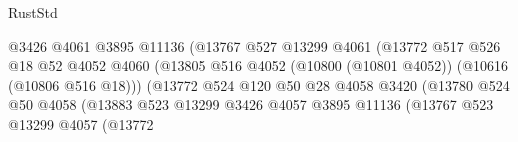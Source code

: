 \begin{lexlean}{RustStd}
\begin{coremodule}
                                                @3426
                                                @4061
                                                @3895
                                                @11136
                                                (@13767
                                                  @527
                                                  @13299
                                                  @4061
                                                  (@13772
                                                    @517
                                                    @526
                                                    @18
                                                    @52
                                                    @4052
                                                    @4060
                                                    (@13805
                                                      @516
                                                      @4052
                                                      (@10800 (@10801 @4052))
                                                      (@10616 (@10806 @516 @18)))
                                                    (@13772
                                                      @524
                                                      @120
                                                      @50
                                                      @28
                                                      @4058
                                                      @3420
                                                      (@13780
                                                        @524
                                                        @50
                                                        @4058
                                                        (@13883
                                                          @523
                                                          @13299
                                                          @3426
                                                          @4057
                                                          @3895
                                                          @11136
                                                          (@13767
                                                            @523
                                                            @13299
                                                            @4057
                                                            (@13772

\end{coremodule}
\end{lexlean}
